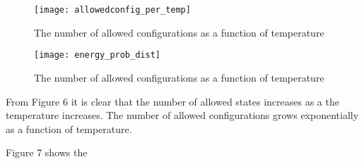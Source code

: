 \documentclass[12pt]{article}
\begin{document}
\begin{figure}[H]
\texttt{[image: allowedconfig\_per\_temp]}
\caption{The number of allowed configurations as a function of temperature}
\end{figure}


\begin{figure}[H]
\texttt{[image: energy\_prob\_dist]}
\caption{The number of allowed configurations as a function of temperature}
\end{figure}

From Figure 6 it is clear that the number of allowed states increases as a the temperature increases. The number of allowed configurations grows exponentially as a function of temperature. 

Figure 7 shows the 
\end{document}
